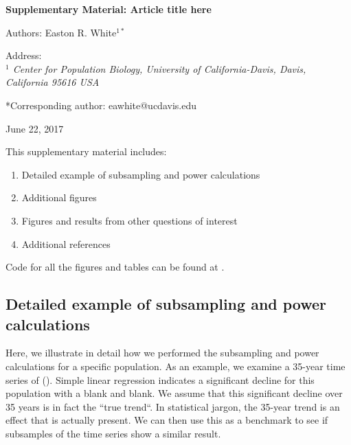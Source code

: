 \documentclass[12pt,]{article}
\title{}
\author{}
\date{}
\providecommand{\tightlist}{%
  \setlength{\itemsep}{0pt}\setlength{\parskip}{0pt}}
\begin{document}
\vspace{2cm}

\begin{center}
 \textbf{Supplementary Material: Article title here}
 
Authors: Easton R. White$^{1*}$
\vspace{3 mm}

Address: \\ \emph{$^1$ Center for Population Biology, University of California-Davis, Davis, California 95616 USA}

*Corresponding author: eawhite@ucdavis.edu

June 22, 2017
 \end{center}

\vspace{2cm}

This supplementary material includes:

\begin{enumerate}
\def\labelenumi{\arabic{enumi}.}
\tightlist
\item
  Detailed example of subsampling and power calculations
\item
  Additional figures
\item
  Figures and results from other questions of interest
\item
  Additional references
\end{enumerate}

Code for all the figures and tables can be found at
\href{https://github.com/erwhite1}{}.

\vspace{2cm}

\subsection{Detailed example of subsampling and power
calculations}\label{detailed-example-of-subsampling-and-power-calculations}

Here, we illustrate in detail how we performed the subsampling and power
calculations for a specific population. As an example, we examine a
35-year time series of (). Simple linear regression indicates a
significant decline for this population with a blank and blank. We
assume that this significant decline over 35 years is in fact the ``true
trend``. In statistical jargon, the 35-year trend is an effect that is
actually present. We can then use this as a benchmark to see if
subsamples of the time series show a similar result.
\end{document}
